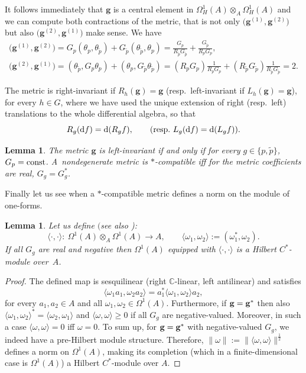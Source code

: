 \documentclass[10pt,a4paper]{amsart}
\numberwithin{equation}{section}
\newtheorem{Lemma}[Theorem]{Lemma}
\newcommand{\C}{\mathbb{C}}
\newcommand{\ip}{{\tilde{p}}}
\begin{document}
It follows immediately that $\mathbf{g}$ is a central element in $\Omega^1_H(A) \otimes_A \Omega^1_H(A)$ and
we can compute both contractions of the metric, that is not only $ \big(\mathbf{g}^{(1)},\mathbf{g}^{(2)}\big)$
but also $ \big(\mathbf{g}^{(2)},\mathbf{g}^{(1)}\big)$ make sense.
We have
\begin{gather}
\big(\mathbf{g}^{(1)},\mathbf{g}^{(2)}\big)=G_p(\theta_p,\theta_{\ip})+G_\ip(\theta_\ip,\theta_p)=\frac{G_p}{R_\ip G_\ip}+\frac{G_\ip}{R_{p} G_p}, \nonumber\\
\big(\mathbf{g}^{(2)},\mathbf{g}^{(1)}\big)=(\theta_\ip,G_p\theta_p)+(\theta_p,G_\ip\theta_{\ip})=(R_pG_p)\frac{1}{R_pG_p}+(R_\ip G_\ip)\frac{1}{R_\ip G_\ip}=2.\label{metric-short}
\end{gather}

\begin{Definition}
The metric is right-invariant if $R_{{h}}(\mathbf{g}) = \mathbf{g}$ (resp.\ left-invariant if $L_{{h}}(\mathbf{g}) = \mathbf{g}$),
for every $h\in G$, where we have used the unique extension of right (resp.\ left) translations to the whole differential algebra, so that
\[ R_g({\rm d}f)={\rm d}(R_gf), \qquad (\mathrm{resp.} \ L_g({\rm d}f)={\rm d}(L_gf)).\]
\end{Definition}

\begin{Lemma}The metric $\mathbf{g}$ is left-invariant if and only if for every $g\in\{p,\ip\}$, $G_p={\rm const}$. A~nondegenerate
metric is $\ast$-compatible iff for the metric coefficients are real, $G_g=G_g^\ast$.
\end{Lemma}

Finally let us see when a $*$-compatible metric defines a norm on the module of one-forms.

\begin{Lemma}\label{Hilbert}
Let us define $($see also {\rm \cite[Proposition~8.40]{BM_book})}:
\[ \langle \cdot, \cdot \rangle \colon \ \Omega^1(A)\otimes_A\Omega^1(A)\rightarrow A,
\qquad \langle \omega_1, \omega_2 \rangle:=(\omega_1^\ast,\omega_2). \]
If all $G_g$ are real and negative then $\Omega^1(A)$ equipped with $\langle \cdot,\cdot\rangle$ is a Hilbert $C^\ast$-module over~$A$.
\end{Lemma}
\begin{proof}
The defined map is sesquilinear (right $\C$-linear, left antilinear) and satisfies
\[ \langle \omega_1 a_1, \omega_2 a_2 \rangle= a_1^* \langle \omega_1,\omega_2\rangle a_2,\]
for every $a_1,a_2 \in A$ and all $\omega_{1},\omega_2\in\Omega^1(A)$.
Furthermore, if ${\bf g}={\bf g}^\ast$ then also $\langle \omega_1, \omega_2\rangle^\ast = \langle \omega_2, \omega_1\rangle$ and $\langle \omega,\omega\rangle \ge 0$ if all $G_g$
are negative-valued. Moreover, in such a case $\langle \omega,\omega\rangle=0$ iff $\omega=0$. To sum up, for ${\bf g}={\bf g}^*$ with negative-valued $G_g$, we indeed
have a pre-Hilbert module structure. Therefore, $\|\omega\|:=\|\langle \omega, \omega\rangle\|^{\frac{1}{2}}$ defines a norm on $\Omega^1(A)$,
making its completion (which in a finite-dimensional case is $\Omega^1(A)$) a
Hilbert $C^\ast$-module over $A$.
\end{proof}
\end{document}
